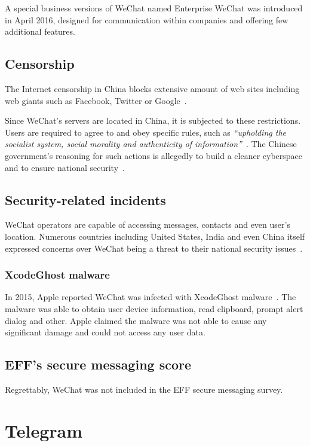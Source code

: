 \documentclass[thesis=M,english]{FITthesis}[2012/10/20]
\begin{document}
A special business versions of WeChat named Enterprise WeChat was introduced in April 2016, designed for communication within companies and offering few additional features.

\subsection{Censorship}

The Internet censorship in China blocks extensive amount of web sites including web giants such as Facebook, Twitter or Google~\cite{china-twitter,china-facebook}.

Since WeChat's servers are located in China, it is subjected to these restrictions. Users are required to agree to and obey specific rules, such as \emph{``upholding the socialist system, social morality and authenticity of information''}~\cite{china-imblocking}. The Chinese government's reasoning for such actions is allegedly to build a cleaner cyberspace and to ensure national security~\cite{china-blocking2}.

\subsection{Security-related incidents}

WeChat operators are capable of accessing messages, contacts and even user's location. Numerous countries including United States, India and even China itself expressed concerns over WeChat being a threat to their national security issues~\cite{wechat-states}.

\subsubsection{XcodeGhost malware}

In 2015, Apple reported WeChat was infected with XcodeGhost malware~\cite{wechat-xcodemalware}. The malware was able to obtain user device information, read clipboard, prompt alert dialog and other. Apple claimed the malware was not able to cause any significant damage and could not access any user data.

\subsection{EFF's secure messaging score}

Regrettably, WeChat was not included in the EFF secure messaging survey.


\section{Telegram}
\end{document}
